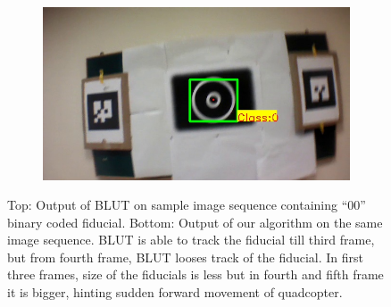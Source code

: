 \documentclass[runningheads]{llncs}
\begin{document}
\begin{figure}
\begin{subfigure}[b]{.19\textwidth}
\end{subfigure}
\begin{subfigure}[b]{.19\textwidth}
\includegraphics[width=\linewidth]{BLUT_input_00/output6.jpg}
\end{subfigure}
\caption{Top: Output of BLUT\cite{Wu:2011} on sample image sequence containing ``00''
binary coded fiducial. Bottom: Output of our algorithm on the same image
sequence. BLUT is able to track the fiducial till third frame, but from fourth
frame, BLUT looses track of the fiducial. In first three frames, size of the
fiducials is less but in fourth and fifth frame it is bigger, hinting sudden
forward movement of quadcopter.}
\label{fig:BLUT_compare_00}
\end{figure}
\end{document}

